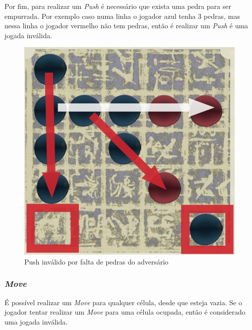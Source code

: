 \documentclass[a4paper]{article}
\begin{document}
Por fim, para realizar um \textit{Push} é necessário que exista uma pedra para ser empurrada. Por exemplo caso numa linha o jogador azul tenha 3 pedras, mas nessa linha o jogador vermelho não tem pedras, então é realizar um  \textit{Push} é uma jogada inválida.

\begin{figure}[!htb]
\centering
\includegraphics[scale=0.3]{push2.png} 
\caption{Push inválido por falta de pedras do adversário}
\end{figure}

\subsubsection{\textit{Move}}

É possível realizar um  \textit{Move} para qualquer célula, desde que esteja vazia. Se o jogador tentar realizar um \textit{Move} para uma célula ocupada, então é considerado uma jogada inválida.
\end{document}
